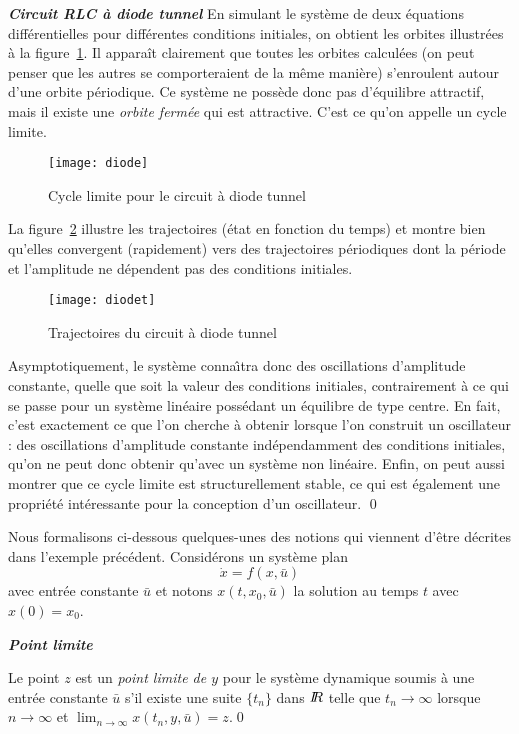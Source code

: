 {\begin{exemple} {\bf  \em Circuit RLC {à} diode tunnel}
En simulant le syst{è}me de deux {é}quations
diff{é}rentielles pour diff{é}rentes conditions initiales, on obtient les orbites
illustr{é}es  
{à} la figure~\ref{fig:diode}. Il apparaît clairement que toutes
les orbites calcul{é}es (on peut penser que les autres se comporteraient de la m{ê}me
mani{è}re) s'enroulent autour d'une orbite p{é}riodique. Ce syst{è}me ne
poss{è}de donc pas d'{é}quilibre attractif, mais il existe une {\em
orbite ferm{é}e} qui est attractive. C'est ce qu'on appelle un
cycle limite.
\begin{figure}[htbp] 
   \centering
   \texttt{[image: diode]} 
   \caption{Cycle limite pour le circuit {à} diode tunnel}
   \label{fig:diode}
\end{figure}
La figure~\ref{fig:simudiodet} illustre les trajectoires ({é}tat en fonction du temps) et 
montre bien qu'elles convergent (rapidement) vers des trajectoires p{é}riodiques dont la
p{é}riode et l'amplitude ne d{é}pendent pas des conditions initiales.
\begin{figure}[htbp] %
   \centering
   \texttt{[image: diodet]} 
   \caption{Trajectoires du circuit {à} diode tunnel}
   \label{fig:simudiodet}
\end{figure}

Asymptotiquement, le syst{è}me conna\^{\i}tra  donc des oscillations   
d'amplitude  constante, quelle que soit la valeur des conditions initiales,
contrairement {à} ce qui se passe pour un syst{è}me lin{é}aire poss{é}dant
un {é}quilibre de type centre. En fait, c'est exactement ce que l'on cherche {à}
obtenir lorsque l'on construit un oscillateur : des oscillations d'amplitude
constante ind{é}pendamment des conditions initiales, qu'on ne peut donc obtenir
qu'avec un syst{è}me non lin{é}aire. Enfin, on peut aussi montrer que ce cycle limite est
structurellement stable, ce qui est {é}galement une propri{é}t{é} int{é}ressante pour la
conception d'un oscillateur. 
\qed
\end{exemple}

Nous formalisons ci-dessous quelques-unes des notions qui viennent d'{ê}tre d{é}crites dans l'exemple précédent.
Consid{é}rons un syst{è}me plan $$\dot x=f(x,\bar u)$$ avec entrée constante $\bar u$ et notons $x(t,x_0,\bar u)$ la solution au temps $t$ avec $x(0)=x_0$.

\begin{definition}{\bf\em Point limite}

Le point $z$ est un {\em point limite de $y$} pour le syst{è}me dynamique  
soumis {à} une
entr{é}e constante $\bar u$  s'il existe une suite $\{t_n\}$ dans
$I \! \! R$ telle que $t_n \rightarrow \infty$ lorsque $n \rightarrow \infty$ et
$\lim_{n\rightarrow \infty} x(t_n,y,\bar u)=z$.\qed
\end{definition}

}
